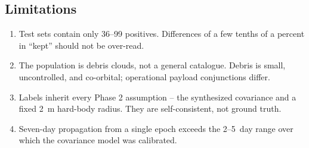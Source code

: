 
\subsection{Limitations}

\begin{enumerate}
  \item Test sets contain only 36--99 positives. Differences of a few tenths
        of a percent in ``kept'' should not be over-read.
  \item The population is debris clouds, not a general catalogue. Debris is
        small, uncontrolled, and co-orbital; operational payload
        conjunctions differ.
  \item Labels inherit every Phase 2 assumption -- the synthesized
        covariance and a fixed \SI{2}{\meter} hard-body radius. They are
        self-consistent, not ground truth.
  \item Seven-day propagation from a single epoch exceeds the
        \numrange{2}{5}~day range over which the covariance model was
        calibrated.
\end{enumerate}
